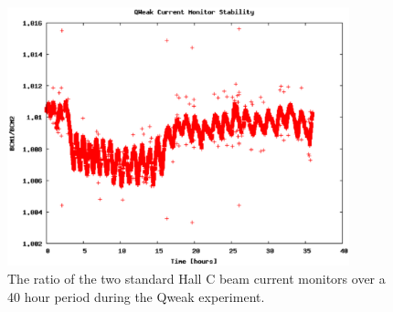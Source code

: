 \begin{figure}
\begin{center}
\includegraphics[height=75mm, angle=0]{./figs/qweak}
\end{center}
\caption{The ratio of the two standard Hall C beam current monitors over a 40 hour period during the Qweak experiment.}
\label{qweak}
\end{figure}

